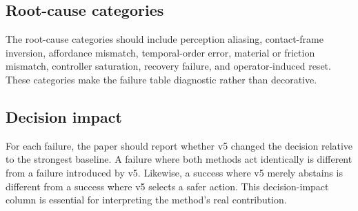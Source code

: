 \documentclass{article}
\begin{document}
\subsection{Root-cause categories}
The root-cause categories should include perception aliasing, contact-frame inversion, affordance mismatch, temporal-order error, material or friction mismatch, controller saturation, recovery failure, and operator-induced reset. These categories make the failure table diagnostic rather than decorative.

\subsection{Decision impact}
For each failure, the paper should report whether v5 changed the decision relative to the strongest baseline. A failure where both methods act identically is different from a failure introduced by v5. Likewise, a success where v5 merely abstains is different from a success where v5 selects a safer action. This decision-impact column is essential for interpreting the method's real contribution.


\begingroup
\raggedright
\nocite{*}


\endgroup
\end{document}
